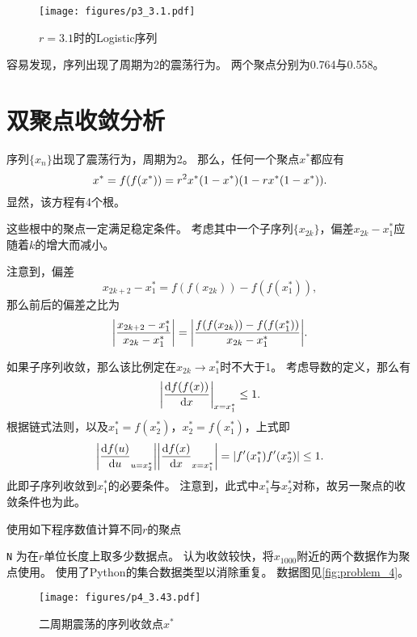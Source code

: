 \begin{figure}
    \centering
    \texttt{[image: figures/p3\_3.1.pdf]}
    \caption{$r = 3.1$时的Logistic序列}
    \label{fig:problem_3}
\end{figure}

容易发现，序列出现了周期为2的震荡行为。
两个聚点分别为0.764与0.558。

\section{双聚点收敛分析}\label{sec:double_conv}
序列$\{x_n\}$出现了震荡行为，周期为2。
那么，任何一个聚点$x^*$都应有
\begin{equation}
    x^* = f(f(x^*)) = r^2x^*(1-x^*)\qty(1-rx^*(1-x^*)).
\end{equation}
显然，该方程有4个根。

这些根中的聚点一定满足稳定条件。
考虑其中一个子序列$\{x_{2k}\}$，偏差$x_{2k}-x_1^*$应随着$k$的增大而减小。

注意到，偏差
\begin{equation}
    x_{2k+2} - x_1^* = f(f(x_{2k})) - f(f(x_1^*)),
\end{equation}
那么前后的偏差之比为
\begin{equation}\label{eq:error_double}
    \qty|\frac{x_{2k+2} - x_1^*}{x_{2k} - x_1^*}|
    = \qty|\frac{f(f(x_{2k})) - f(f(x_1^*))}{x_{2k} - x_1^*}|.
\end{equation}

如果子序列收敛，那么该比例定在$x_{2k}\to x_1^*$时不大于1。
考虑导数的定义，那么有
\begin{equation}
    \qty|\dv{f(f(x))}{x}|_{x=x_1^*} \le 1.
\end{equation}
根据链式法则，以及$x_1^* = f(x_2^*)$，$x_2^* = f(x_1^*)$，上式即
\begin{equation}
    \qty|\dv{f(u)}{u}_{u=x_2^*}|\qty|\dv{f(x)}{x}_{x=x_1^*}| = \qty|f'(x_1^*)f'(x_2^*)| \le 1.
\end{equation}
此即子序列收敛到$x_1^*$的必要条件。
注意到，此式中$x_1^*$与$x_2^*$对称，故另一聚点的收敛条件也为此。

使用如下程序数值计算不同$r$的聚点
{
    \linespread{1.0}
    
}
\verb|N| 为在$r$单位长度上取多少数据点。
认为收敛较快，将$x_{1000}$附近的两个数据作为聚点使用。
使用了\textsf{Python}的集合数据类型以消除重复。
数据图见\autoref{fig:problem_4}。

\begin{figure}
    \centering
    \texttt{[image: figures/p4\_3.43.pdf]}
    \caption{二周期震荡的序列收敛点$x^*$}
    \label{fig:problem_4}
\end{figure}

